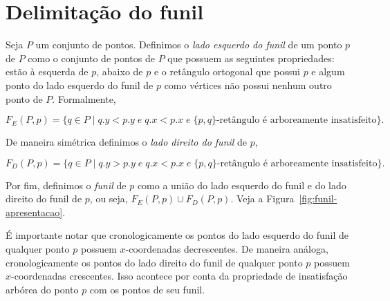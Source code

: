 \section{Delimitação do funil} \label{seção:funil}

Seja $P$ um conjunto de pontos. Definimos o \textit{lado esquerdo do funil} de um ponto $p$ de $P$ como o conjunto de pontos de $P$ que possuem as seguintes propriedades: estão à esquerda de $p$, abaixo de $p$ e o retângulo ortogonal que possui $p$ e algum ponto do lado esquerdo do funil de $p$ como vértices não possui nenhum outro ponto de $P$. Formalmente, 

{\centering $F_E(P,p) = \{q \in P \mid q.y < p.y \; e \; q.x < p.x \; e \; \{p,q\}\text{-retângulo é arboreamente insatisfeito}\}.$}

De maneira simétrica definimos o \textit{lado direito do funil} de $p$,

{\centering $F_D(P,p) = \{q \in P \mid q.y > p.y \; e \; q.x < p.x \; e \; \{p,q\}\text{-retângulo é arboreamente insatisfeito}\}.$}

Por fim, definimos o \textit{funil} de $p$ como a união do lado esquerdo do funil e do lado direito do funil de $p$, ou seja, $F_E(P,p) \cup F_D(P,p)$. Veja a Figura~\ref{fig:funil-apresentacao}.

É importante notar que cronologicamente os pontos do lado esquerdo do funil de qualquer ponto $p$ possuem $x$-coordenadas decrescentes. De maneira análoga, cronologicamente os pontos do lado direito do funil de qualquer ponto $p$ possuem $x$-coordenadas crescentes. Isso acontece por conta da propriedade de insatisfação arbórea do ponto $p$ com os pontos de seu funil.

